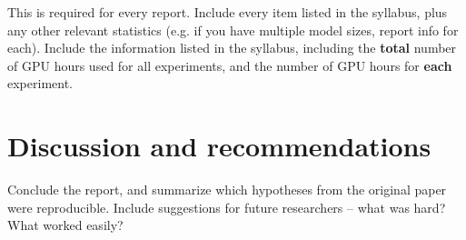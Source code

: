 \documentclass[11pt,a4paper]{article}
\begin{document}
This is required for every report. Include every item listed in the syllabus, plus any other relevant statistics (e.g. if you have multiple model sizes, report info for each).
Include the information listed in the syllabus, including the \textbf{total} number of GPU hours used for all experiments, and the number of GPU hours for \textbf{each} experiment.

\section{Discussion and recommendations}
Conclude the report, and summarize which hypotheses from the original paper were reproducible. Include suggestions for future researchers -- what was hard? What worked easily? 



\end{document}
